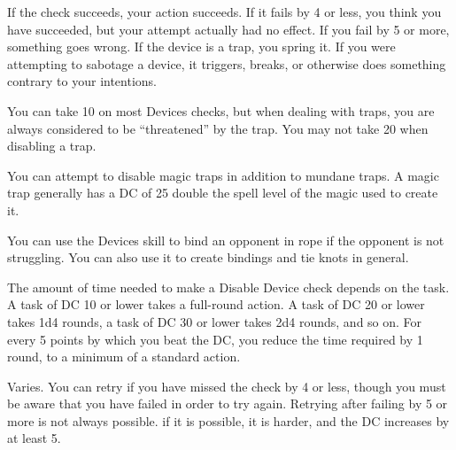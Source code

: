 If the check succeeds, your action succeeds. If it fails by 4 or less, you think you have succeeded, but your attempt actually had no effect. If you fail by 5 or more, something goes wrong. If the device is a trap, you spring it. If you were attempting to sabotage a device, it triggers, breaks, or otherwise does something contrary to your intentions.

You can take 10 on most Devices checks, but when dealing with traps, you are always considered to be ``threatened'' by the trap. You may not take 20 when disabling a trap.

\par You can attempt to disable magic traps in addition to mundane traps. A magic trap generally has a DC of 25 \add double the spell level of the magic used to create it.

 You can use the Devices skill to bind an opponent in rope if the opponent is not struggling. You can also use it to create bindings and tie knots in general.

 The amount of time needed to make a Disable Device check depends on the task. A task of DC 10 or lower takes a full-round action. A task of DC 20 or lower takes 1d4 rounds, a task of DC 30 or lower takes 2d4 rounds, and so on. For every 5 points by which you beat the DC, you reduce the time required by 1 round, to a minimum of a standard action.

 Varies. You can retry if you have missed the check by 4 or less, though you must be aware that you have failed in order to try again. Retrying after failing by 5 or more is not always possible. if it is possible, it is harder, and the DC increases by at least 5.

